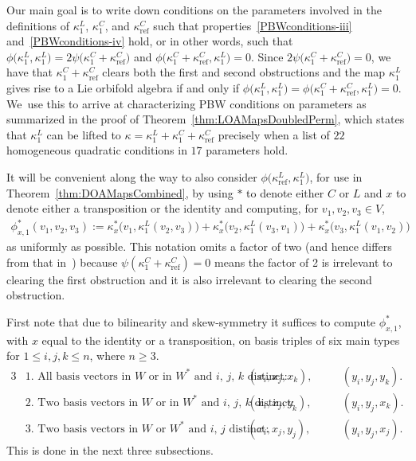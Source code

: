 \documentclass[pdftex]{sigma}
\numberwithin{equation}{section}
\DeclareMathOperator{\refl}{ref}
\begin{document}
Our main goal is to write down conditions on the parameters involved in the definitions
of $\kappa^L_1$, $\kappa^C_1$, and $\kappa^C_{\refl}$ such that properties~\eqref{PBWconditions-iii}
and~\eqref{PBWconditions-iv} hold, or in other words, such that
$\phi\big(\kappa^L_1,\kappa^L_1\big)=2\psi\big(\kappa^C_1+\kappa^C_{\refl}\big)$ and
$\phi\big(\kappa^C_1+\kappa^C_{\refl},\kappa^L_1\big)=0$.
Since $2\psi\big(\kappa^C_1+\kappa^C_{\refl}\big)=0$, we have that
$\kappa^C_1+\kappa^C_{\refl}$ clears both the first and second obstructions and
the map $\kappa^L_1$ gives rise to a Lie orbifold algebra if and only if
$\phi\big(\kappa^L_1,\kappa^L_1\big)=\phi\big(\kappa^C_1+\kappa^C_{\refl},\kappa^L_1\big)=0$. We~use this to arrive at characterizing PBW conditions on parameters as summarized in
the proof of
Theorem~\ref{thm:LOAMapsDoubledPerm}, which states that $\kappa^L_1$ can
be lifted to $\kappa=\kappa^L_1+\kappa^C_1+\kappa^C_{\refl}$ precisely when a list of $22$
homogeneous quadratic conditions in $17$ parameters hold.

It will be convenient along the way to also consider $\phi\big(\kappa^L_{\refl},\kappa^L_1\big)$,
for use in Theorem~\ref{thm:DOAMapsCombined}, by using $*$ to denote
either $C$ or $L$ and $x$ to denote either a transposition or the identity and
computing, for $v_1,v_2,v_3 \in V$,
\begin{gather*}
\phi_{x,1}^*(v_1,v_2,v_3):=\kappa^*_x\big(v_1,\kappa^L_1(v_2,v_3)\big)
+\kappa^*_x\big(v_2,\kappa^L_1(v_3,v_1)\big)+\kappa^*_x\big(v_3,\kappa^L_1(v_1,v_2)\big)
\end{gather*}
as uniformly as possible.
This notation omits a factor of two (and hence differs from that in~\cite{FGK})
because $\psi(\kappa^C_1+\kappa^C_{\refl})=0$ means the factor of 2 is irrelevant to
clearing the first obstruction and it is also irrelevant to clearing
the second obstruction.

First note that due to bilinearity and skew-symmetry it suffices to compute $\phi_{x,1}^*$,
with $x$ equal to the identity or a transposition, on basis triples of six main types
for $1 \leq i, j, k \leq n$, where $n\geq 3$.
\begin{alignat*}{3}
&\text{1.\ All basis vectors in $W$ or in $W^*$ and $i$, $j$, $k$ distinct:} &\hspace{10pt}
& (x_i,x_j,x_k), & &\quad (y_i,y_j,y_k). \\
&\text{2.\ Two basis vectors in $W$ or in $W^*$ and $i$, $j$, $k$ distinct:} &\hspace{10pt}
& (x_i,x_j,y_k), & &\quad (y_i,y_j,x_k). \\
&\text{3.\ Two basis vectors in $W$ or $W^*$ and $i$, $j$ distinct:} &\hspace{10pt}
& (x_i,x_j,y_j), & &\quad (y_i,y_j,x_j).
\end{alignat*}
This is done in the next three subsections.
\end{document}
